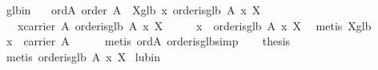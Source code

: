 \begin{isabellebody}
\isanewline
{}\isamarkupfalse%
\ glb{}in{}\isanewline
\ \ \ ord{}A{}\ {}order\ A{}\ \ X{}glb{}\ {}{}x{}\ order{}is{}glb\ A\ x\ X{}\isanewline
\ \ \ {}{}x{}carrier\ A{}\ order{}is{}glb\ A\ x\ X{}\isanewline
%
\isadelimproof
%
\endisadelimproof
%
\isatagproof
{}\isamarkupfalse%
\ {}\isanewline
\ \ \isamarkupfalse%
\ x\ \ {}order{}is{}glb\ A\ x\ X{}\ \isamarkupfalse%
\ {}metis\ X{}glb{}\isanewline
\ \ \isamarkupfalse%
\ {}x\ {}\ carrier\ A{}\isanewline
\ \ \ \ \isamarkupfalse%
\ {}metis\ ord{}A\ order{}is{}glb{}simp{}\isanewline
\ \ \isamarkupfalse%
\ {}thesis\isanewline
\ \ \ \ \isamarkupfalse%
\ {}metis\ {}order{}is{}glb\ A\ x\ X{}{}\isanewline
{}\isamarkupfalse%
%
\endisatagproof
{\isafoldproof}%
%
\isadelimproof
\isanewline
%
\endisadelimproof
\isanewline
{}\isamarkupfalse%
\ lub{}in{}\isanewline

\end{isabellebody}
